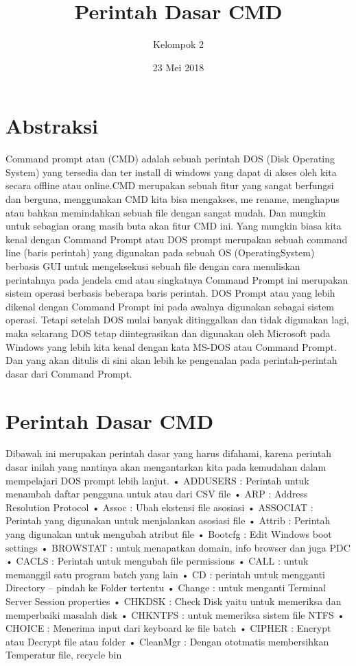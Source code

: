 \documentclass{article}
\title{Perintah Dasar CMD}
\author{Kelompok 2}
\date{23 Mei 2018}
\begin{document}
\maketitle
\section{Abstraksi}
Command prompt atau (CMD) adalah sebuah perintah DOS (Disk Operating System)  yang tersedia dan ter install di windows yang dapat di akses oleh kita secara offline atau online.CMD merupakan sebuah fitur yang sangat berfungsi dan berguna, menggunakan CMD kita bisa mengakses, me rename, menghapus atau bahkan memindahkan sebuah file dengan sangat mudah. 
Dan mungkin untuk sebagian orang masih buta akan fitur CMD ini. Yang mungkin biasa kita kenal dengan Command Prompt atau DOS prompt merupakan sebuah command line (baris perintah) yang digunakan pada sebuah OS (OperatingSystem) berbasis GUI untuk mengeksekusi sebuah file dengan cara menuliskan perintahnya pada jendela cmd atau singkatnya Command Prompt ini merupakan sistem operasi berbasis beberapa baris perintah.
DOS Prompt atau yang lebih dikenal dengan Command Prompt ini pada awalnya digunakan sebagai sistem operasi. Tetapi setelah DOS mulai banyak ditinggalkan dan tidak digunakan lagi, maka sekarang DOS tetap diintegrasikan dan digunakan oleh Microsoft pada Windows yang lebih kita kenal dengan kata MS-DOS atau Command Prompt. Dan yang akan ditulis di sini akan lebih ke pengenalan pada perintah-perintah dasar dari Command Prompt.
\section{Perintah Dasar CMD}
Dibawah ini merupakan perintah dasar yang harus difahami, karena perintah dasar inilah yang nantinya akan mengantarkan kita pada kemudahan dalam mempelajari DOS prompt lebih lanjut.
• ADDUSERS : Perintah untuk menambah  daftar pengguna untuk atau dari CSV file
• ARP : Address Resolution Protocol
• Assoc : Ubah ekstensi file  asosiasi
• ASSOCIAT : Perintah yang digunakan untuk menjalankan asosiasi file
• Attrib : Perintah yang digunakan untuk mengubah atribut file
• Bootcfg : Edit Windows boot settings
• BROWSTAT : untuk menapatkan domain, info browser dan juga PDC
• CACLS : Perintah untuk mengubah file permissions
• CALL : untuk memanggil satu program batch yang lain
• CD : perintah untuk mengganti Directory – pindah ke Folder tertentu
• Change : untuk menganti Terminal Server Session properties
• CHKDSK : Check Disk yaitu untuk memeriksa dan memperbaiki masalah disk
• CHKNTFS : untuk memeriksa sistem file NTFS
• CHOICE : Menerima input dari keyboard ke file batch
• CIPHER : Encrypt atau Decrypt file atau folder
• CleanMgr : Dengan ototmatis membersihkan Temperatur file, recycle bin
\end{document}
